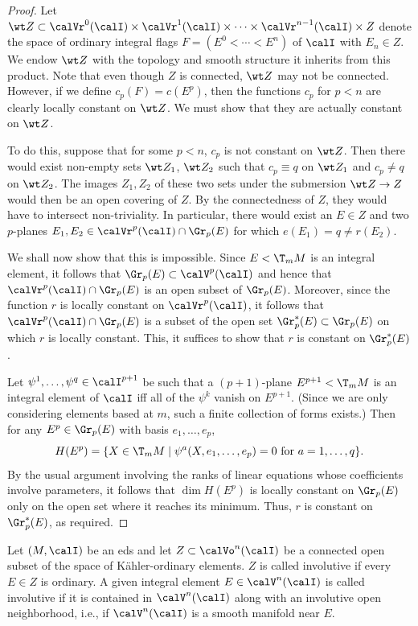 \begin{proof}
    Let $\wt Z\subset \calVr^0(\calI)\times \calVr^1(\calI)\times\cdots\times \calVr^{n-1}(\calI)\times Z$ denote the space of ordinary integral flags $F=(E^0<\cdots<E^n)$ of $\calI$ with $E_n\in Z$. We endow $\wt Z$ with the topology and smooth structure it inherits from this product. Note that even though $Z$ is connected, $\wt Z$ may not be connected. However, if we define $c_p(F)=c(E^p)$, then the functions $c_p$ for $p<n$ are clearly locally constant on $\wt Z$. We must show that they are actually constant on $\wt Z$.

    To do this, suppose that for some $p<n$, $c_p$ is not constant on $\wt Z$. Then there would exist non-empty sets $\wt Z_1$, $\wt Z_2$ such that $c_p\equiv q$ on $\wt Z_1$ and $c_p\neq q$ on $\wt Z_2$. The images $Z_1,Z_2$ of these two sets under the submersion $\wt Z\to Z$ would then be an open covering of $Z$. By the connectedness of $Z$, they would have to intersect non-triviality. In particular, there would exist an $E\in Z$ and two $p$-planes $E_1,E_2\in\calVr^p(\calI)\cap\Gr_p(E)$ for which $e(E_1)=q\neq r(E_2)$.

    We shall now show that this is impossible. Since $E<\T_m M$ is an integral element, it follows that $\Gr_p(E)\subset \calV^p(\calI)$ and hence that $\calVr^p(\calI)\cap\Gr_p(E)$ is an open subset of $\Gr_p(E)$. Moreover, since the function $r$ is locally constant on $\calVr^p(\calI)$, it follows that $\calVr^p(\calI)\cap \Gr_p(E)$ is a subset of the open set $\Gr_p^\ast(E)\subset\Gr_p(E)$ on which $r$ is locally constant. This, it suffices to show that $r$ is constant on $\Gr_p^\ast(E)$.

    Let $\psi^1,\ldots,\psi^q\in\calI^{p+1}$ be such that a $(p+1)$-plane $E^{p+1}<\T_m M$ is an integral element of $\calI$ iff all of the $\psi^k$ vanish on $E^{p+1}$. (Since we are only considering elements based at $m$, such a finite collection of forms exists.) Then for any $E^p\in\Gr_p(E)$ with basis $e_1,\ldots,e_p$,
    \[H(E^p)=\{X\in\T_m M\mid \psi^a(X,e_1,\ldots,e_p)=0\text{ for }a=1,\ldots,q\}.\]
    By the usual argument involving the ranks of linear equations whose coefficients involve parameters, it follows that $\dim H(E^p)$ is locally constant on $\Gr_p(E)$ only on the open set where it reaches its minimum. Thus, $r$ is constant on $\Gr_p^\ast(E)$, as required.
\end{proof}


\begin{defn}
    Let $(M,\calI)$ be an \gls{eds} and let $Z\subset\calVo^n(\calI)$ be a connected open subset of the space of K\"ahler-ordinary elements. $Z$ is called involutive if every $E\in Z$ is ordinary. A given integral element $E\in\calV^n(\calI)$ is called involutive if it is contained in $\calV^n(\calI)$ along with an involutive open neighborhood, i.e., if $\calV^n(\calI)$ is a smooth manifold near $E$.
\end{defn}


